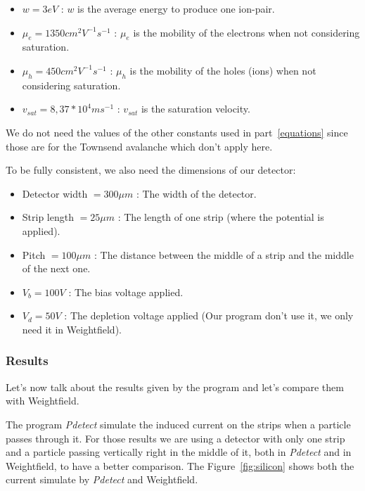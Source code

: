\documentclass[11pt]{article}
\begin{document}
			\begin{itemize}

				\item $w = 3 eV$ : $w$ is the average energy to produce one ion-pair.
				\item $\mu_e = 1350 cm^2V^{-1}s^{-1}$ : $\mu_e$ is the mobility of the electrons
					when not considering saturation.
				\item $\mu_h = 450 cm^2V^{-1}s^{-1}$ : $\mu_h$ is the mobility of the holes (ions)
					when not considering saturation.
				\item $v_{sat} = 8,37*10^{4} ms^{-1}$ : $v_{sat}$ is the saturation velocity.

			\end{itemize}

			We do not need the values of the other constants used in part~\ref{equations} since
			those are for the Townsend avalanche which don't apply here.

			To be fully consistent, we also need the dimensions of our detector:

			\begin{itemize}

				\item Detector width $= 300 \mu m$ : The width of the detector.
				\item Strip length $= 25 \mu m$ : The length of one strip (where the potential is
					applied).
				\item Pitch $= 100 \mu m$ : The distance between the middle of a strip and the middle
					of the next one.
				\item $V_b = 100 V$ : The bias voltage applied.
				\item $V_d = 50 V$ : The depletion voltage applied (Our program don't use it, we only
					need it in Weightfield).

			\end{itemize}

		\subsubsection*{Results}

			Let's now talk about the results given by the program and let's compare them with Weightfield.

			The program \textit{Pdetect} simulate the induced current on the strips when a particle passes through it.
			For those results we are using a detector with only one strip and a particle passing vertically right in 
			the middle of it, both in \textit{Pdetect} and in Weightfield, to have a better comparison. The 
			Figure~\ref{fig:silicon} shows both the current simulate by \textit{Pdetect} and Weightfield.
\end{document}
